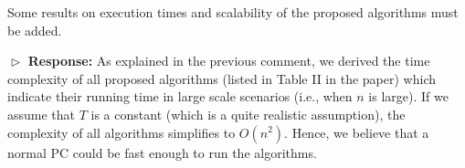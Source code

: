 \documentclass[11pt]{article}
\newcommand{\bt}[1]{{\color{red}#1}}%
\newcommand{\bt}[1]{#1}
\begin{document}

\vspace{3mm}
{\color{blue} Some results on execution times and scalability of the proposed algorithms must be added.
 }
\vspace{3mm}

$\vartriangleright$ \noindent\textbf{Response:} 
\bt{As explained in the previous comment, we derived the time complexity of all proposed algorithms (listed in Table II in the paper) which indicate their running time in large scale scenarios (i.e., when $n$ is large). If we assume that $T$ is a constant (which is a quite realistic assumption), the complexity of all algorithms simplifies to $O(n^2)$. Hence, we believe that a normal PC could be fast enough to run the algorithms.}

%
\end{document}
